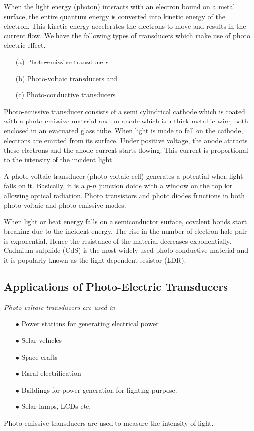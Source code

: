 When the light energy (photon) interacts with an electron bound on a metal surface, the entire quantum energy is converted into kinetic energy of the electron. This kinetic energy accelerates the electrons to move and results in the current flow. We have the following types of transducers which make use of photo electric effect.
\begin{itemize}
\item[(a)] Photo-emissive transducers

\item[(b)] Photo-voltaic transducers and

\item[(c)] Photo-conductive transducers 
\end{itemize}

Photo-emissive transducer consists of a semi cylindrical cathode which is coated with a photo-emissive material and an anode which is a thick metallic wire, both enclosed in an evacuated glass tube. When light is made to fall on the cathode, electrons are emitted from its surface. Under positive voltage, the anode attracts  these electrons and the anode current starts flowing. This current is proportional to the intensity of the incident light.

A photo-voltaic transducer (photo-voltaic cell) generates a potential when light falls on it. Basically, it is a $p$-$n$ junction doide with a window on the top for allowing optical radiation. Photo transistors and photo diodes functions in both photo-voltaic and photo-emissive modes.

When light or heat energy falls on a semiconductor surface, covalent bonds start breaking due to the incident energy. The rise in the number of electron hole pair is exponential. Hence the resistance of the material decreases exponentially. Cadmium sulphide (CdS) is the most widely used photo conductive material and it is popularly known as the light dependent resistor (LDR).

\subsection{Applications of Photo-Electric Transducers}\label{sec8.15.1}

{\em Photo voltaic transducers are used in}
\begin{itemize}
\item[$\bullet$] Power stations for generating electrical power

\item[$\bullet$] Solar vehicles 

\item[$\bullet$] Space crafts

\item[$\bullet$] Rural electrification 

\item[$\bullet$] Buildings for power generation for lighting purpose.

\item[$\bullet$] Solar lamps, LCDs etc.
\end{itemize}
Photo emissive transducers are used to measure the intensity of light.

